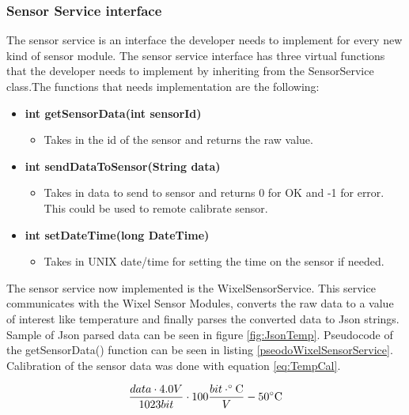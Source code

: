 \subsubsection{Sensor Service interface}
The sensor service is an interface the developer needs to implement for every new kind of
sensor module. The sensor service interface has three virtual functions that the developer
needs to implement by inheriting from the SensorService class.The functions that needs implementation are the following:
\begin{itemize}
    \item \textbf{int getSensorData(int sensorId)}
        \begin{itemize}
            \item Takes in the id of the sensor and returns the raw value.
        \end{itemize}
    \item \textbf{int sendDataToSensor(String data)}
        \begin{itemize}
            \item Takes in data to send to sensor and returns 0 for OK and -1 for error.
                  This could be used to remote calibrate sensor.
        \end{itemize}
    \item \textbf{int setDateTime(long DateTime)}
        \begin{itemize}
            \item Takes in UNIX date/time for setting the time on the sensor if needed.
        \end{itemize}
\end{itemize}
The sensor service now implemented is the WixelSensorService. This service communicates 
with the Wixel Sensor Modules, converts the raw data to a value of interest like 
temperature and finally parses the converted data to Json\cite{json} strings. Sample
of Json parsed data can be seen in figure \ref{fig:JsonTemp}. Pseudocode of the 
getSensorData() function can be seen in listing \ref{pseodoWixelSensorService}. Calibration
of the sensor data was done with equation \ref{eq:TempCal}.

\begin{equation}\label{eq:TempCal}
    \frac{data \cdot 4.0V}{1023bit} \cdot 100\frac{bit \cdot \celsius}{V} - 50\celsius
\end{equation}

